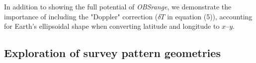 In addition to showing the full potential of \textit{OBSrange}, we demonstrate the importance of including the "Doppler" correction ($\delta T$ in equation (5)), accounting for Earth's ellipsoidal shape when converting latitude and longitude to $x$--$y$.





\subsection{Exploration of survey pattern geometries} \label{sec:surv_geom_tests}